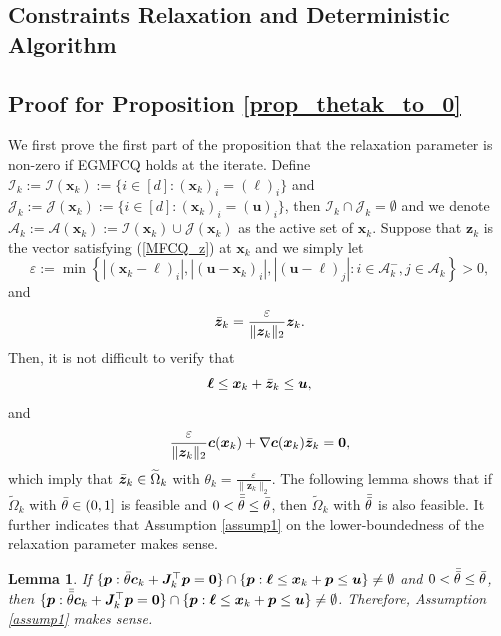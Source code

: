 \documentclass[aos]{imsart}
\numberwithin{equation}{section}
\theoremstyle{plain}
\newtheorem{lemma}{Lemma}
\begin{document}
\begin{appendix}
\newpage
\section{Constraints Relaxation and Deterministic Algorithm}
\label{sec:appendix1}
\subsection{Proof for Proposition \ref{prop_thetak_to_0}}
\label{sec:appendix1.1}
We first prove the first part of the proposition that the relaxation parameter is non-zero if EGMFCQ holds at the iterate. Define $\mathcal{I}_k := \mathcal{I}(\bm{x}_k):= \{ i \in [d]: (\bm{x}_k)_i = (\bm{\ell})_i \}$ and  $\mathcal{J}_k := \mathcal{J}(\bm{x}_k):= \{ i \in [d]: (\bm{x}_k)_i = (\bm{u})_i \}$, then $\mathcal{I}_k \cap \mathcal{J}_k = \emptyset$ and we denote $\mathcal{A}_k := \mathcal{A}(\bm{x}_k) := \mathcal{I}(\bm{x}_k) \cup \mathcal{J}(\bm{x}_k)$ as the active set of $\bm{x}_k$. Suppose that $\bm{z}_k$ is the vector satisfying (\ref{MFCQ_z}) at $\bm{x}_k$ and we simply let 
$$\varepsilon := \min\left\{\left|(\bm{x}_k - \bm{\ell})_{i}\right|, \left|(\bm{u} -\bm{x}_k)_{i}\right| , \left|(\bm{u} - \bm{\ell})_{j}\right| : i \in \mathcal{A}_k^{-}, j \in \mathcal{A}_k\right\}>0,$$
and
\begin{equation*}
    \Bar{\bm{z}}_k = \frac{\varepsilon}{\|\bm{z}_k\|_2} \bm{z}_k.
\end{equation*}
Then, it is not difficult to verify that 
\begin{equation*}
    \bm{\ell} \leq \bm{x}_k + \Bar{\bm{z}}_k \leq \bm{u},
\end{equation*}
and
\begin{equation}
\label{construct_theta_k}
    \frac{\varepsilon}{\|\bm{z}_k\|_2} \bm{c}(\bm{x}_k) + \nabla \bm{c}(\bm{x}_k) \Bar{\bm{z}}_k = \bm{0},
\end{equation}
which imply that $\Bar{\bm{z}}_k \in \widetilde{\Omega}_k$ with $\theta_k = \frac{\varepsilon}{\|\bm{z}_k\|_2}$. The following lemma shows that if $\widetilde{\Omega}_k$ with $\Bar{\theta} \in (0,1]$ is feasible and $0<\Bar{\Bar{\theta}} \leq \Bar{\theta}$, then $\widetilde{\Omega}_k$ with $\Bar{\Bar{\theta}}$ is also feasible. It further indicates that Assumption \ref{assump1} on the lower-boundedness of the relaxation parameter makes sense. 


\begin{lemma}
\label{prop_reason}
    If $\{\bm{p}: \Bar{\theta} \bm{c}_k +  \bm{J}_k^{\top} \bm{p} = \bm{0}\} \cap \{\bm{p}: \bm{\ell} \leq \bm{x}_k + \bm{p} \leq \bm{u}\} \neq \emptyset$ and $0<\Bar{\Bar{\theta}} \leq \Bar{\theta}$, then $\{\bm{p}: \Bar{\Bar{\theta}} \bm{c}_k +  \bm{J}_k^{\top} \bm{p} = \bm{0}\} \cap \{\bm{p}: \bm{\ell} \leq \bm{x}_k + \bm{p} \leq \bm{u}\} \neq \emptyset$. Therefore, Assumption \ref{assump1} makes sense. 
\end{lemma}



\end{appendix}
\end{document}
